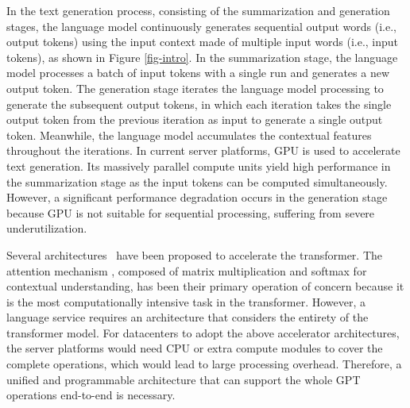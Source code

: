 In the text generation process, consisting of the summarization and generation stages, the language model continuously generates sequential output words (i.e., output tokens) using the input context made of multiple input words (i.e., input tokens), as shown in Figure \ref{fig-intro}. 
In the summarization stage, the language model processes a batch of input tokens with a single run and generates a new output token. The generation stage iterates the language model processing to generate the subsequent output tokens, in which each iteration takes the single output token from the previous iteration as input to generate a single output token. Meanwhile, the language model accumulates the contextual features throughout the iterations.
In current server platforms, GPU\cite{dgx} is used to accelerate text generation. Its massively parallel compute units yield high performance in the summarization stage as the input tokens can be computed simultaneously. However, a significant performance degradation occurs in the generation stage because GPU is not suitable for sequential processing, suffering from severe underutilization.



Several architectures~\cite{ham2020a3, ham2021elsa, wang2021spatten, lu2021sanger} have been proposed to accelerate the transformer. The attention mechanism \cite{vaswani2017attention}, composed of matrix multiplication and softmax for contextual understanding, has been their primary operation of concern because it is the most computationally intensive task in the transformer. However, a language service requires an architecture that considers the entirety of the transformer model. For datacenters to adopt the above accelerator architectures, the server platforms would need CPU or extra compute modules to cover the complete operations, which would lead to large processing overhead. Therefore, a unified and programmable architecture that can support the whole GPT operations end-to-end is necessary.


